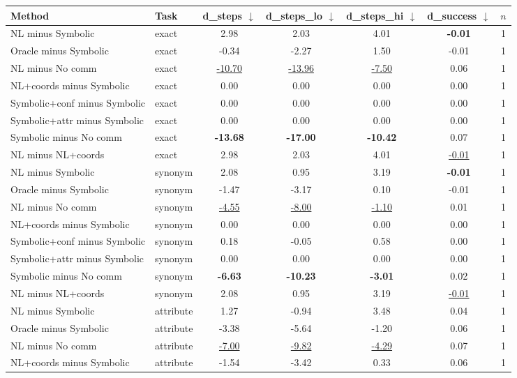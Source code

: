 \begin{tabular}{llccccc}
\toprule
Method & Task & d\_steps $\downarrow$ & d\_steps\_lo $\downarrow$ & d\_steps\_hi $\downarrow$ & d\_success $\downarrow$ & $n$ \\
\midrule
NL minus Symbolic & exact & 2.98 & 2.03 & 4.01 & \textbf{-0.01} & 1 \\
Oracle minus Symbolic & exact & -0.34 & -2.27 & 1.50 & -0.01 & 1 \\
NL minus No comm & exact & \underline{-10.70} & \underline{-13.96} & \underline{-7.50} & 0.06 & 1 \\
NL+coords minus Symbolic & exact & 0.00 & 0.00 & 0.00 & 0.00 & 1 \\
Symbolic+conf minus Symbolic & exact & 0.00 & 0.00 & 0.00 & 0.00 & 1 \\
Symbolic+attr minus Symbolic & exact & 0.00 & 0.00 & 0.00 & 0.00 & 1 \\
Symbolic minus No comm & exact & \textbf{-13.68} & \textbf{-17.00} & \textbf{-10.42} & 0.07 & 1 \\
NL minus NL+coords & exact & 2.98 & 2.03 & 4.01 & \underline{-0.01} & 1 \\
\midrule
NL minus Symbolic & synonym & 2.08 & 0.95 & 3.19 & \textbf{-0.01} & 1 \\
Oracle minus Symbolic & synonym & -1.47 & -3.17 & 0.10 & -0.01 & 1 \\
NL minus No comm & synonym & \underline{-4.55} & \underline{-8.00} & \underline{-1.10} & 0.01 & 1 \\
NL+coords minus Symbolic & synonym & 0.00 & 0.00 & 0.00 & 0.00 & 1 \\
Symbolic+conf minus Symbolic & synonym & 0.18 & -0.05 & 0.58 & 0.00 & 1 \\
Symbolic+attr minus Symbolic & synonym & 0.00 & 0.00 & 0.00 & 0.00 & 1 \\
Symbolic minus No comm & synonym & \textbf{-6.63} & \textbf{-10.23} & \textbf{-3.01} & 0.02 & 1 \\
NL minus NL+coords & synonym & 2.08 & 0.95 & 3.19 & \underline{-0.01} & 1 \\
\midrule
NL minus Symbolic & attribute & 1.27 & -0.94 & 3.48 & 0.04 & 1 \\
Oracle minus Symbolic & attribute & -3.38 & -5.64 & -1.20 & 0.06 & 1 \\
NL minus No comm & attribute & \underline{-7.00} & \underline{-9.82} & \underline{-4.29} & 0.07 & 1 \\
NL+coords minus Symbolic & attribute & -1.54 & -3.42 & 0.33 & 0.06 & 1 \\

\end{tabular}
